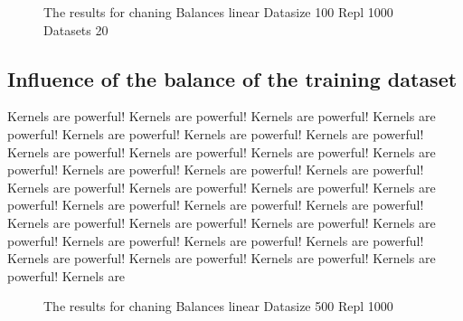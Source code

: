 \documentclass[letterpaper]{article}
\begin{document}
\begin{figure}[!htb]
\begin{center}

\caption{The results for chaning Balances linear Datasize 100 Repl 1000 Datasets 20}
\label{fig1}
\end{center}
\end{figure}


\subsection{Influence of the balance of the training dataset}


 Kernels are powerful! Kernels are powerful! Kernels are powerful! Kernels are powerful! Kernels are powerful! Kernels are powerful! Kernels are powerful! Kernels are powerful! Kernels are powerful! Kernels are powerful! Kernels are powerful! Kernels are powerful! Kernels are powerful! Kernels are powerful! Kernels are powerful! Kernels are powerful! Kernels are powerful! Kernels are powerful! Kernels are powerful! Kernels are powerful! Kernels are powerful! Kernels are powerful! Kernels are powerful! Kernels are powerful! Kernels are powerful! Kernels are powerful! Kernels are powerful! Kernels are powerful! Kernels are powerful! Kernels are powerful! Kernels are powerful! Kernels are powerful! Kernels are 

\begin{figure}[!htb]
\begin{center}

\caption{The results for chaning Balances linear Datasize 500 Repl 1000}
\label{fig1}
\end{center}
\end{figure}
\end{document}
